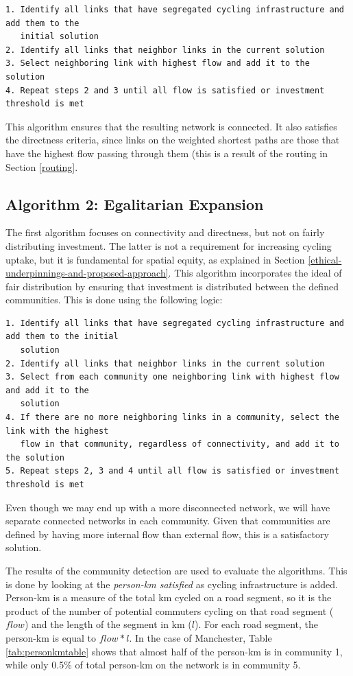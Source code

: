 \documentclass[
]{article}
\begin{document}
\begin{verbatim}
1. Identify all links that have segregated cycling infrastructure and add them to the 
   initial solution
2. Identify all links that neighbor links in the current solution
3. Select neighboring link with highest flow and add it to the solution
4. Repeat steps 2 and 3 until all flow is satisfied or investment threshold is met
\end{verbatim}

This algorithm ensures that the resulting network is connected. It also
satisfies the directness criteria, since links on the weighted shortest
paths are those that have the highest flow passing through them (this is
a result of the routing in Section \ref{routing}.

\hypertarget{algorithm-2-egalitarian-expansion}{%
\subsection{Algorithm 2: Egalitarian Expansion}\label{algorithm-2-egalitarian-expansion}}

The first algorithm focuses on connectivity and directness, but not on
fairly distributing investment. The latter is not a requirement for
increasing cycling uptake, but it is fundamental for spatial equity, as
explained in Section \ref{ethical-underpinnings-and-proposed-approach}. This algorithm incorporates
the ideal of fair distribution by ensuring that investment is distributed between the defined communities.
This is done using the following logic:

\begin{verbatim}
1. Identify all links that have segregated cycling infrastructure and add them to the initial
   solution
2. Identify all links that neighbor links in the current solution
3. Select from each community one neighboring link with highest flow and add it to the
   solution
4. If there are no more neighboring links in a community, select the link with the highest
   flow in that community, regardless of connectivity, and add it to the solution
5. Repeat steps 2, 3 and 4 until all flow is satisfied or investment threshold is met
\end{verbatim}

Even though we may end up with a more disconnected network, we will have
separate connected networks in each community. Given that communities
are defined by having more internal flow than external flow, this is a
satisfactory solution.

The results of the community detection are used to evaluate the
algorithms. This is done by looking at the \emph{person-km satisfied} as
cycling infrastructure is added. Person-km is a measure of the total km
cycled on a road segment, so it is the product of the number of
potential commuters cycling on that road segment (\(flow\)) and the length
of the segment in km (\(l\)). For each road segment, the person-km is
equal to \(flow * l\). In the case of Manchester, Table
\ref{tab:personkmtable} shows that almost half of the person-km is in
community 1, while only 0.5\% of total person-km on the network is in
community 5.
\end{document}
